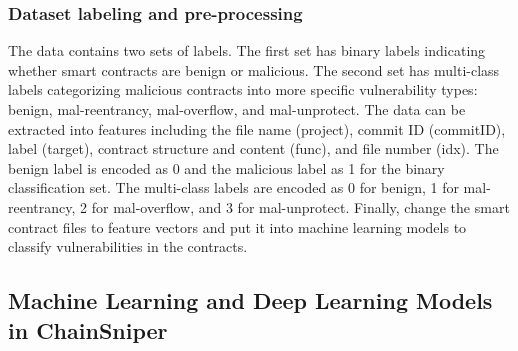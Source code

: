 \documentclass[sigconf]{acmart}
\begin{document}
\subsubsection{Dataset labeling and pre-processing}
The data contains two sets of labels. The first set has binary labels indicating whether smart contracts are benign or malicious. The second set has multi-class labels categorizing malicious contracts into more specific vulnerability types: benign, mal-reentrancy, mal-overflow, and mal-unprotect. The data can be extracted into features including the file name (project), commit ID (commitID), label (target), contract structure and content (func), and file number (idx). The benign label is encoded as 0 and the malicious label as 1 for the binary classification set. The multi-class labels are encoded as 0 for benign, 1 for mal-reentrancy, 2 for mal-overflow, and 3 for mal-unprotect. Finally, change the smart contract files to feature vectors and put it into machine learning models to classify vulnerabilities in the contracts.

\subsection{Machine Learning and Deep Learning Models in ChainSniper}
\end{document}

